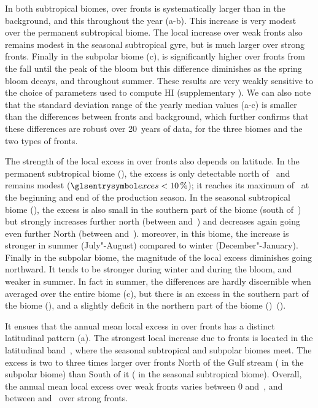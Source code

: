 In both subtropical biomes,  over fronts is systematically larger than in the background, and this throughout the year (a-b).
This increase is very modest over the permanent subtropical biome.
The local increase over weak fronts also remains modest in the seasonal subtropical gyre, but is much larger over strong fronts.
Finally in the subpolar biome (c),  is significantly higher over fronts from the fall until the peak of the bloom but this difference diminishes as the spring bloom decays, and throughout summer.
These results are very weakly sensitive to the choice of parameters used to compute HI (supplementary ).
We can also note that the standard deviation range of the yearly median values (a-c) is smaller than the differences between fronts and background, which further confirms that these differences are robust over 20~years of data, for the three biomes and the two types of fronts.

The strength of the local excess in  over fronts also depends on latitude.
In the permanent subtropical biome (), the excess is only detectable north of~ and remains modest (\(\am{exces} < \pct{10}\)); it reaches its maximum of~ at the beginning and end of the production season.
In the seasonal subtropical biome (), the excess is also small in the southern part of the biome (south of~) but strongly increases further north (between  and~) and decreases again going even further North (between  and~).
moreover, in this biome, the increase is stronger in summer (July"-August) compared to winter (December"-January).
Finally in the subpolar biome, the magnitude of the local excess diminishes going northward.
It tends to be stronger during winter and during the bloom, and weaker in summer.
In fact in summer, the differences are hardly discernible when averaged over the entire biome (c), but there is an excess  in the southern part of the biome (), and a slightly deficit in the northern part of the biome ()~().

It ensues that the annual mean local excess in  over fronts has a distinct latitudinal pattern (a).
The strongest local increase due to fronts is located in the latitudinal band~, where the seasonal subtropical and subpolar biomes meet.
The excess is two to three times larger over fronts North of the Gulf stream ( in the subpolar biome) than South of it ( in the seasonal subtropical biome).
Overall, the annual mean local excess over weak fronts varies between \num{0} and~, and between  and~ over strong fronts.



